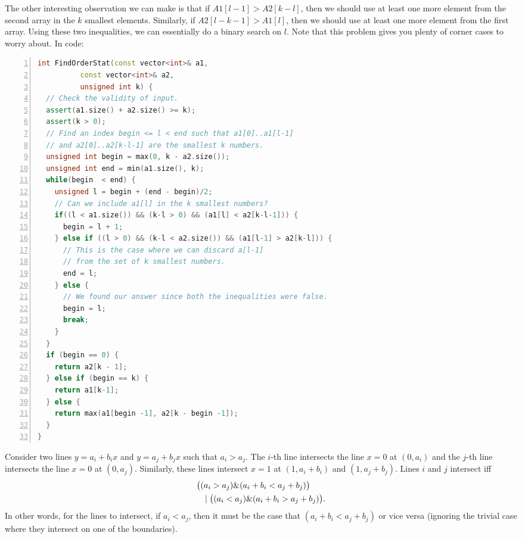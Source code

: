 The other interesting observation we can make is that if $A1[l-1] >
A2[k-l]$, then we should use at least one more element from the second
array in the $k$ smallest elements. Similarly, if $A2[l-k-1] > A1[l]$,
then we should use at least one more element from the first
array. Using these two inequalities, we can essentially do a binary
search on $l$.  Note that this problem gives you plenty of corner
cases to worry about. In code:
\begin{lstlisting}[basicstyle=\footnotesize,numbers=left,breaklines=true,language=C++]
int FindOrderStat(const vector<int>& a1,
		  const vector<int>& a2,
		  unsigned int k) {
  // Check the validity of input.
  assert(a1.size() + a2.size() >= k);
  assert(k > 0);
  // Find an index begin <= l < end such that a1[0]..a1[l-1]
  // and a2[0]..a2[k-l-1] are the smallest k numbers.
  unsigned int begin = max(0, k - a2.size());
  unsigned int end = min(a1.size(), k); 
  while(begin  < end) {
    unsigned l = begin + (end - begin)/2;
    // Can we include a1[l] in the k smallest numbers?
    if((l < a1.size()) && (k-l > 0) && (a1[l] < a2[k-l-1])) {
      begin = l + 1;
    } else if ((l > 0) && (k-l < a2.size()) && (a1[l-1] > a2[k-l])) {
      // This is the case where we can discard a[l-1]
      // from the set of k smallest numbers.
      end = l;
    } else {
      // We found our answer since both the inequalities were false.
      begin = l;
      break;
    } 
  }
  if (begin == 0) {
    return a2[k - 1];
  } else if (begin == k) {
    return a1[k-1];
  } else { 
    return max(a1[begin -1], a2[k - begin -1]);
  }
}
\end{lstlisting}


Consider two lines  $y = a_i + b_ix$ and
$y = a_j + b_j x$  such that $a_i > a_j$.
The $i$-th line intersects the line $x = 0$ at $(0, a_i)$ and the
$j$-th line intersects the line $x = 0$ at $(0,a_j)$. Similarly,
these lines intersect $x = 1$ at $(1, a_i + b_i)$ and $(1,
a_j + b_j)$. Lines $i$ and $j$ intersect iff 
 {
\begin{eqnarray*}
\lefteqn{\big((a_i > a_j) \& (a_i + b_i < a_j + b_j)\big)}  &  &  \\
& & | \; \big((a_i < a_j) \& (a_i + b_i > a_j + b_j)\big) . 
\end{eqnarray*}
}
In other words, for the lines to intersect, if $a_i < a_j$,
then it must be the case that  $(a_i + b_i < a_j + b_j)$ or vice versa
(ignoring the trivial
case where they intersect on one of the boundaries). 

